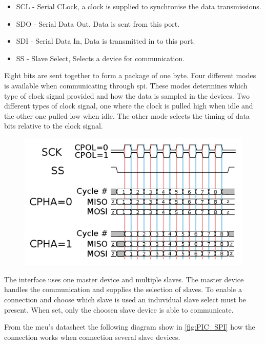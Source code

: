 \begin{itemize}[noitemsep]
	\item SCL - Serial CLock, a clock is supplied to synchronise the data transmissions.
	\item SDO - Serial Data Out, Data is sent from this port.
	\item SDI - Serial Data In, Data is transmitted in to this port.
	\item SS - Slave Select, Selects a device for communication.
\end{itemize}
Eight bits are sent together to form a package of one byte. Four different modes is available when communicating through \gls{spi}. These modes determines which type of clock signal provided and how the data is sampled in the devices. Two different types of clock signal, one where the clock is pulled high when idle and the other one pulled low when idle. 
The other mode selects the timing of data bits relative to the clock signal.  


\begin{figure}[H]
	\centering
    \includegraphics[width=.8\linewidth]{Figures/spi_timing}
	\label{fig:SPI_timing}
\end{figure}


The interface uses one master device and multiple slaves. The master device handles the communication and supplies the selection of slaves. To enable a connection and choose which slave is used an induvidual slave select must be present. When set, only the choosen slave device is able to communicate.

From the \gls{mcu}'s datasheet the following diagram show in \autoref{fig:PIC_SPI} how the connection works when connection several slave devices.

